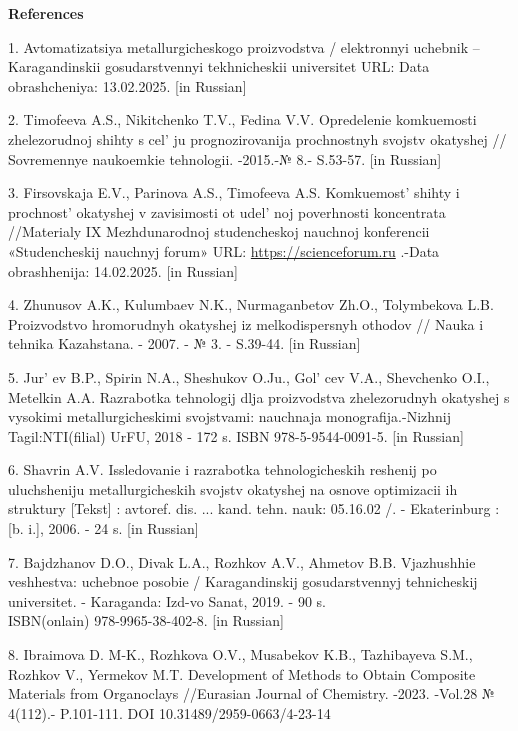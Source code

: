 \begin{center}
{\bfseries References}
\end{center}

\begin{references}
1. Avtomatizatsiya metallurgicheskogo proizvodstva / elektronnyi uchebnik
-- Karagandinskii gosudarstv\-ennyi tekhnicheskii universitet URL:
\href{https://www.kstu.kz/wp-content/uploads/2018/05/tsifrovaya-mitallurgiya/el-uch-po-ampr/index.htm-}{}
Data obrashcheniya: 13.02.2025. {[}in Russian{]}

2. Timofeeva A.S., Nikitchenko T.V., Fedina V.V. Opredelenie komkuemosti
zhelezorudnoj shihty s cel' ju prognozirovanija
prochnostnyh svojstv okatyshej // Sovremennye naukoemkie tehnologii.
-2015.-№ 8.- S.53-57. {[}in Russian{]}

3. Firsovskaja E.V., Parinova A.S., Timofeeva A.S.
Komkuemost'{} shihty i prochnost'{}
okatyshej v zavis\-imosti ot udel' noj poverhnosti
koncentrata //Materialy IX Mezhdunarodnoj studencheskoj nauchnoj
konf\-erencii «Studencheskij nauchnyj forum» URL:
\href{https://scienceforum.ru/2017/article/2017038139}{https://scienceforum.ru} .-Data obrashhenija:
14.02.2025. {[}in Russian{]}

4. Zhunusov A.K., Kulumbaev N.K., Nurmaganbetov Zh.O., Tolymbekova L.B.
Proizvodstvo hromorudnyh okatyshej iz melkodispersnyh othodov // Nauka i
tehnika Kazahstana. - 2007. - № 3. - S.39-44. {[}in Russian{]}

5. Jur' ev B.P., Spirin N.A., Sheshukov O.Ju.,
Gol' cev V.A., Shevchenko O.I., Metelkin A.A. Razrabotka
tehnologij dlja proizvodstva zhelezorudnyh okatyshej s vysokimi
metallurgicheskimi svojstvami: nauchnaja monografija.-Nizhnij
Tagil:NTI(filial) UrFU, 2018 - 172 s. ISBN 978-5-9544-0091-5. {[}in
Russian{]}

6. Shavrin A.V. Issledovanie i razrabotka tehnologicheskih reshenij po
uluchsheniju metallurgicheskih svojstv okatyshej na osnove optimizacii
ih struktury {[}Tekst{]} : avtoref. dis. ... kand. tehn. nauk: 05.16.02
/. - Ekaterinburg : {[}b. i.{]}, 2006. - 24 s. {[}in Russian{]}

7. Bajdzhanov D.O., Divak L.A., Rozhkov A.V., Ahmetov B.B. Vjazhushhie
veshhestva: uchebnoe posobie / Karagandinskij gosudarstvennyj
tehnicheskij universitet. - Karaganda: Izd-vo Sanat, 2019. - 90 s.\\
ISBN(onlain) 978-9965-38-402-8. {[}in Russian{]}

8. Ibraimova D. M-K., Rozhkova O.V., Musabekov K.B., Tazhibayeva S.M.,
Rozhkov V., Yermekov M.T. Development of Methods to Obtain Composite
Materials from Organoclays //Eurasian Journal of Chemistry. -2023.
-Vol.28 № 4(112).- P.101-111. DOI 10.31489/2959-0663/4-23-14


\end{references}
